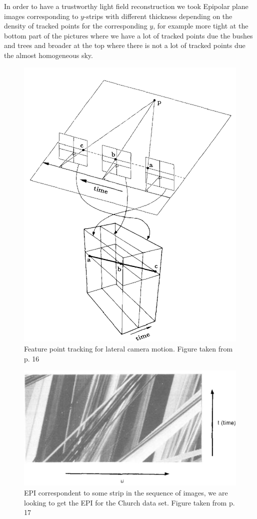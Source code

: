 \bigskip

In order to have a trustworthy light field reconstruction we took Epipolar plane images corresponding to $y$-strips with different thickness depending on the density of tracked points for the corresponding $y$, for example more tight at the bottom part of the pictures where we have a lot of tracked points due the bushes and trees and  broader at the top where there is not a lot of tracked points due the almost homogeneous sky.

\begin{figure}[h!]
\centering
\includegraphics[width = 0.6 \textwidth]{./Diagrams/lateral_motion_epi.jpg}
\caption{Feature point tracking for lateral camera motion. Figure taken from \cite{Bolles} p. 16}
\label{lateral_motion_epi}
\end{figure}

\begin{figure}[h!]
\centering
\includegraphics[width = 0.8 \textwidth]{./Diagrams/EPI_bolles.jpg}
\caption{EPI correspondent to some strip in the sequence of images, we are looking to get the EPI for the Church data set. Figure taken from \cite{Bolles} p. 17}
\label{EPI_bolles}
\end{figure}


